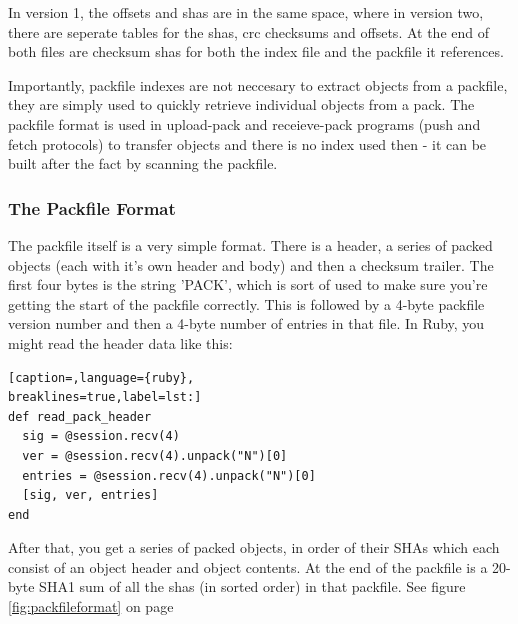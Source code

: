 In version 1, the offsets and shas are in the same space, where in version two,
there are seperate tables for the shas, crc checksums and offsets. At the end
of both files are checksum shas for both the index file and the packfile it
references.

Importantly, packfile indexes are not neccesary to extract objects from a
packfile, they are simply used to quickly retrieve individual objects from a
pack. The packfile format is used in upload-pack and receieve-pack programs
(push and fetch protocols) to transfer objects and there is no index used then
- it can be built after the fact by scanning the packfile.

\subsubsection{The Packfile Format}
The packfile itself is a very simple format. There is a header, a series of
packed objects (each with it's own header and body) and then a checksum
trailer. The first four bytes is the string 'PACK', which is sort of used to
make sure you're getting the start of the packfile correctly. This is followed
by a 4-byte packfile version number and then a 4-byte number of entries in that
file. In Ruby, you might read the header data like this:
\lstset{basicstyle=\scriptsize, numbers=none, captionpos=b, tabsize=4}
\begin{lstlisting}[caption=,language={ruby},
breaklines=true,label=lst:]
def read_pack_header
  sig = @session.recv(4)
  ver = @session.recv(4).unpack("N")[0]
  entries = @session.recv(4).unpack("N")[0]
  [sig, ver, entries]
end
\end{lstlisting}

After that, you get a series of packed objects, in order of their SHAs which
each consist of an object header and object contents. At the end of the
packfile is a 20-byte SHA1 sum of all the shas (in sorted order) in that
packfile. See figure \ref{fig:packfileformat} on page \pageref{fig:packfileformat}


